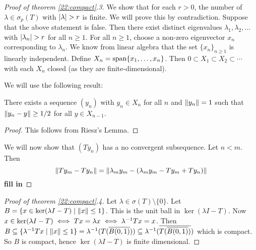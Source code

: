 \begin{proof}[Proof of theorem \ref{22:compact}.3]
  We show that for each $r>0$, the number of $\lambda \in \sigma_p(T)$ with $\left\lvert \lambda \right\rvert>r$ is finite.
  We will prove this by contradiction.
  Suppose that the above statement is false.
  Then there exist distinct eigenvalues $\lambda_1,\lambda_2,\ldots$ with $\left\lvert \lambda_n \right\rvert>r$ for all $n \geq 1$.
  For all $n \geq 1$, choose a non-zero eigenvector $x_n$ corresponding to $\lambda_n$.
  We know from linear algebra that the set $\{x_n\}_{n \geq 1}$ is linearly independent.
  Define $X_n = \operatorname{span}\{x_1,\ldots,x_n\}$.
  Then $0 \subset X_1 \subset X_2 \subset \cdots$ with each $X_n$ closed (as they are finite-dimensional).

  We will use the following result:
  \begin{lem}
    There exists a sequence $(y_n)$ with $y_n \in X_n$ for all $n$ and $\left\lVert y_n \right\rVert=1$ such that $\left\lVert y_n-y \right\rVert \geq 1/2$ for all $y \in X_{n-1}$.
  \end{lem}

  \begin{proof}
    This follows from Riesz's Lemma.
  \end{proof}

  We will now show that $(Ty_n)$ has a no convergent subsequence.
  Let $n<m$.
  Then
  \[ \left\lVert Ty_m-Ty_n \right\rVert = \left\lVert \lambda_my_m-(\lambda_my_m-Ty_m+Ty_n) \right\rVert \]
  \textbf{fill in}
\end{proof}

\begin{proof}[Proof of theorem \ref{22:compact}.4]
  Let $\lambda \in \sigma(T) \setminus \{0\}$.
  Let $B = \{ x \in \ker (\lambda I-T) \mid \left\lVert x \right\rVert \leq 1 \}$.
  This is the unit ball in $\ker(\lambda I-T)$.
  Now $x \in \ker (\lambda I-T) \iff Tx = \lambda x \iff \lambda^{-1} T x = x$.
  Then $B \subseteq \{ \lambda^{-1} Tx \mid \left\lVert x \right\rVert \leq 1 \} = \lambda^{-1} (T(\overline{B(0,1)})) \subseteq \lambda^{-1} (\overline{T(\overline{B(0,1)})})$ which is compact.
  So $B$ is compact, hence $\ker (\lambda I-T)$ is finite dimensional.
\end{proof}
